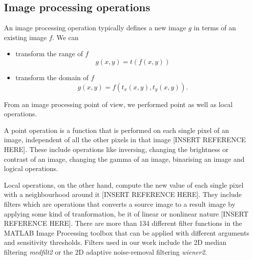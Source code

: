 \subsection{Image processing operations}

An image processing operation typically defines a new image \( g \) in terms of an existing image \( f \).
We can 
\begin{itemize}
	\item transform the range of \( f \)
	\[ 
	g(x, y) = t(f(x,y)) 
	\]
	\item transform the domain of \( f \)
	\[
	g(x,y) = f(t_{x}(x,y), t_{y}(x,y)).
	\]
\end{itemize}


From an image processing point of view, we performed point as well as local operations.

A point operation is a function that is performed on each single pixel of an image, independent of all the other pixels in that image [INSERT REFERENCE HERE]. These include operations like inversing, changing the brightness or contrast of an image, changing the gamma of an image, binarising an image and logical operations. 

Local operations, on the other hand, compute the new value of each single pixel with a neighbourhood around it [INSERT REFERENCE HERE]. %
They include filters which are operations that converts a source image to a result image by applying some kind of tranformation, be it of linear or nonlinear nature [INSERT REFERENCE HERE]. There are more than 134 different filter functions in the MATLAB Image Processing toolbox that can be applied with different arguments and sensitivity thresholds. Filters used in our work include the 2D median filtering \textit{medfilt2} or the 2D adaptive noise-removal filtering \textit{wiener2}.




